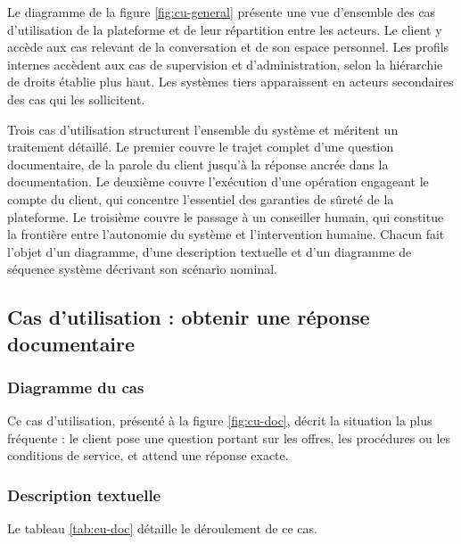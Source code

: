 Le diagramme de la figure \ref{fig:cu-general} présente une vue d'ensemble des cas d'utilisation de la plateforme et de leur répartition entre les acteurs. Le client y accède aux cas relevant de la conversation et de son espace personnel. Les profils internes accèdent aux cas de supervision et d'administration, selon la hiérarchie de droits établie plus haut. Les systèmes tiers apparaissent en acteurs secondaires des cas qui les sollicitent.


Trois cas d'utilisation structurent l'ensemble du système et méritent un traitement détaillé. Le premier couvre le trajet complet d'une question documentaire, de la parole du client jusqu'à la réponse ancrée dans la documentation. Le deuxième couvre l'exécution d'une opération engageant le compte du client, qui concentre l'essentiel des garanties de sûreté de la plateforme. Le troisième couvre le passage à un conseiller humain, qui constitue la frontière entre l'autonomie du système et l'intervention humaine. Chacun fait l'objet d'un diagramme, d'une description textuelle et d'un diagramme de séquence système décrivant son scénario nominal.

\subsection{Cas d'utilisation : obtenir une réponse documentaire}

\subsubsection{Diagramme du cas}

Ce cas d'utilisation, présenté à la figure \ref{fig:cu-doc}, décrit la situation la plus fréquente : le client pose une question portant sur les offres, les procédures ou les conditions de service, et attend une réponse exacte.


\subsubsection{Description textuelle}

Le tableau \ref{tab:cu-doc} détaille le déroulement de ce cas.

